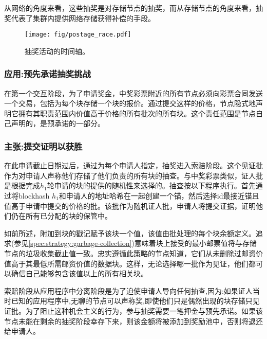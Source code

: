 从网络的角度来看，这些抽奖是对存储节点的抽奖，而从存储节点的角度来看，抽奖代表了集群内提供网络存储获得补偿的手段。 


\begin{figure}[htbp]
  \centering
  \texttt{[image: fig/postage\_race.pdf]}
  \caption[事件的时间轴在抽奖轮\statusgreen]{抽奖活动的时间轴。}
  \label{fig:raffle-timeline}
\end{figure}


\subsubsection{应用:预先承诺抽奖挑战}

在第一个交互阶段，为了申请奖金，中奖彩票附近的所有节点必须向彩票合同发送一个交易，包括为每个块存储一个块的报价。通过提交这样的价格，节点隐式地声明它拥有其职责范围内价值高于价格的所有批次的所有块。这个责任范围是节点自己声明的，是预承诺的一部分。 


\subsubsection{主张:提交证明以获胜}

在此申请截止日期过后，通过为每个申请人指定，抽奖进入索赔阶段。这个见证批作为对申请人声称他们存储了他们负责的所有块的抽查。与中奖彩票类似，证人批是根据完成$h_1$轮申请的块的提供的随机性来选择的。抽查按以下程序执行。首先通过将blockhash $h_1$和申请人的地址哈希在一起创建一个锚，然后选择id最接近锚且值高于申请中提交的价格的批。该批作为随机证人批，申请人将提交证据，证明他们仍在所有已分配的块的保管中。

如前所述，附加到块的戳记赋予该块一个值，该值由批处理的每个块余额定义。追求(参见\ref{spec:strategy:garbage-collection})意味着块上接受的最小邮票值将与存储节点的垃圾收集截止值一致。忠实遵循此策略的节点知道，它们从未删除过邮资价值高于其最低所需邮资价值的数据块。这样，无论选择哪一批作为见证，他们都可以确信自己能够包含该值以上的所有相关块。

索赔阶段从应用程序中分离阶段是为了迫使申请人导向任何抽查,因为:如果证人当时已知的应用程序中,无聊的节点可以声称奖,即使他们只是偶然出现的块存储只见证批。为了阻止这种机会主义的行为，参与抽奖需要一笔押金与预先承诺。如果该节点未能在剩余的抽奖阶段幸存下来，则该金额将被添加到奖励池中，否则将退还给申请人。

